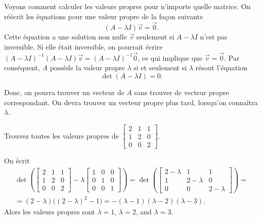Voyons comment calculer les valeurs propres pour n’importe quelle matrice. On réécrit les équations pour une valeur propre de la façon suivante
\begin{equation*}
(A - \lambda I)\vec{v} = \vec{0} .
\end{equation*}
Cette équation a une solution non nulle $\vec{v}$ seulement si 
$A - \lambda I$ n’est pas inversible. Si elle était inversible, on pourrait écrire
${(A - \lambda I)}^{-1}(A - \lambda I)\vec{v} = {(A-\lambda I)}^{-1}\vec{0}$,
ce qui implique que $\vec{v} = \vec{0}$.  Par conséquent,
$A$ possède la valeur propre $\lambda$ si et seulement si $\lambda$ résout l'équation
\begin{equation*}
\det (A-\lambda I) = 0 .
\end{equation*}

Donc, on pourra trouver un vecteur de $A$ sans trouver de vecteur propre correspondant. On devra trouver un vecteur propre plus tard, lorsqu’on connaîtra $\lambda$.

\begin{example}
Trouvez toutes les valeurs propres de
$\left[ \begin{smallmatrix}
2 & 1 & 1 \\
1 & 2 & 0 \\
0 & 0 & 2
\end{smallmatrix} \right]$.

On écrit
\begin{multline*}
\det \left(
\begin{bmatrix}
2 & 1 & 1 \\
1 & 2 & 0 \\
0 & 0 & 2
\end{bmatrix}
- \lambda 
\begin{bmatrix}
1 & 0 & 0 \\
0 & 1 & 0 \\
0 & 0 & 1
\end{bmatrix}
\right)
=
\det \left(
\begin{bmatrix}
2-\lambda & 1 & 1 \\
1 & 2-\lambda & 0 \\
0 & 0 & 2-\lambda
\end{bmatrix}
\right)
= \\
=
(2-\lambda) \bigl({(2-\lambda)}^2 - 1\bigr)
= 
-(\lambda -1)(\lambda -2)(\lambda-3) .
\end{multline*}
Alors les valeurs propres sont $\lambda = 1$, $\lambda = 2$, and
$\lambda = 3$.
\end{example}

